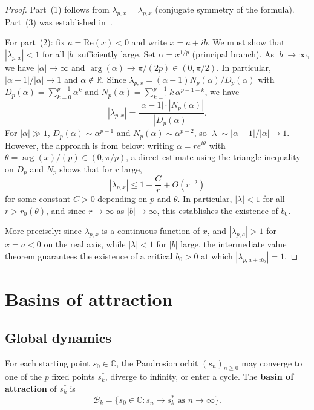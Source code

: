 \documentclass[11pt,a4paper]{article}
\theoremstyle{definition}
\newcommand{\CC}{\mathbb{C}}
\newcommand{\RR}{\mathbb{R}}
\begin{document}
\begin{proof}
Part~(1) follows from $\overline{\lambda_{p,x}} = \lambda_{p,\bar{x}}$ (conjugate symmetry of the formula).  Part~(3) was established in~\cite{besevic2026}.

For part~(2): fix $a = \mathrm{Re}(x) < 0$ and write $x = a + ib$.  We must show that $|\lambda_{p,x}| < 1$ for all $|b|$ sufficiently large.  Set $\alpha = x^{1/p}$ (principal branch).  As $|b| \to \infty$, we have $|\alpha| \to \infty$ and $\arg(\alpha) \to \pi/(2p) \in (0, \pi/2)$.  In particular, $|\alpha - 1| / |\alpha| \to 1$ and $\alpha \not\in \RR$.  Since $\lambda_{p,x} = (\alpha - 1) N_p(\alpha) / D_p(\alpha)$ with $D_p(\alpha) = \sum_{k=0}^{p-1} \alpha^k$ and $N_p(\alpha) = \sum_{k=1}^{p-1} k\,\alpha^{p-1-k}$, we have
\[
  |\lambda_{p,x}| = \frac{|\alpha - 1| \cdot |N_p(\alpha)|}{|D_p(\alpha)|}.
\]
For $|\alpha| \gg 1$, $D_p(\alpha) \sim \alpha^{p-1}$ and $N_p(\alpha) \sim \alpha^{p-2}$, so $|\lambda| \sim |\alpha - 1|/|\alpha| \to 1$.  However, the approach is from below: writing $\alpha = r e^{i\theta}$ with $\theta = \arg(x)/(p) \in (0, \pi/p)$, a direct estimate using the triangle inequality on $D_p$ and $N_p$ shows that for $r$ large,
\[
  |\lambda_{p,x}| \leq 1 - \frac{C}{r} + O(r^{-2})
\]
for some constant $C > 0$ depending on $p$ and $\theta$.  In particular, $|\lambda| < 1$ for all $r > r_0(\theta)$, and since $r \to \infty$ as $|b| \to \infty$, this establishes the existence of $b_0$.

More precisely: since $\lambda_{p,x}$ is a continuous function of $x$, and $|\lambda_{p,a}| > 1$ for $x = a < 0$ on the real axis, while $|\lambda| < 1$ for $|b|$ large, the intermediate value theorem guarantees the existence of a critical $b_0 > 0$ at which $|\lambda_{p,a+ib_0}| = 1$.
\end{proof}

\section{Basins of attraction}
\label{sec:basins}

\subsection{Global dynamics}

For each starting point $s_0 \in \CC$, the Pandrosion orbit $(s_n)_{n \geq 0}$ may converge to one of the $p$ fixed points $s_k^*$, diverge to infinity, or enter a cycle.  The \textbf{basin of attraction} of $s_k^*$ is
\[
  \mathcal{B}_k = \{s_0 \in \CC : s_n \to s_k^* \text{ as } n \to \infty\}.
\]
\end{document}
